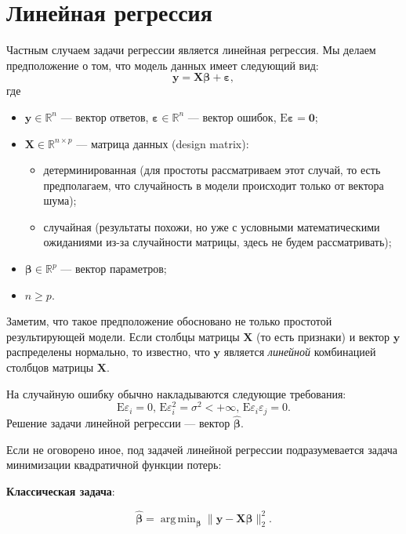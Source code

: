\documentclass[12pt,a4paper,final]{article}
\newcommand{\betah}{\hat{\bm \beta}}
\newcommand{\betaa}{\bm{\beta}}
\newcommand{\epss}{\bm{\varepsilon}}
\newcommand{\E}{\mathrm{E}}
\newcommand{\X}{\bm{X}}
\newcommand{\y}{\bm{y}}
\newcommand{\1}{\mathds{1}}
\DeclareMathOperator*{\argmin}{arg\,min}
\begin{document}
\section{Линейная регрессия}

Частным случаем задачи регрессии является линейная регрессия. Мы делаем предположение о том, что модель данных имеет следующий вид:
\begin{equation}
	\bm y = \X \betaa + \epss,
\end{equation}
где 
\begin{itemize}
	\item $\bm y \in \mathbb R^n$ --- вектор ответов,  $\epss \in \mathbb R^n$ --- вектор ошибок, $\mathrm E\epss = \bm 0$;
	\item $\X \in \mathbb R^{n \times p}$ --- матрица данных (design matrix):
	\begin{itemize}
	\item детерминированная (для простоты рассматриваем этот случай, то есть предполагаем, что случайность в модели происходит только от вектора шума);
	\item случайная (результаты похожи, но уже с условными математическими ожиданиями из-за случайности матрицы, здесь не будем рассматривать);
	\end{itemize}		
	\item $\betaa \in \mathbb R^p$ --- вектор параметров;
	\item $n\geqslant p.$
	\end{itemize}
	
Заметим, что такое предположение обосновано не только простотой результирующей модели. Если столбцы матрицы $\X$ (то есть признаки) и вектор $\y$ распределены нормально, то известно, что $\y$ является \textit{линейной} 	комбинацией столбцов матрицы $\X$.


На случайную ошибку обычно накладываются следующие требования:
\begin{equation}
  \E \varepsilon_i = 0,\, \E \varepsilon_i^2 = \sigma^2 < +\infty,\,  \E \varepsilon_i \varepsilon_j = 0.
\label{req:err}
\end{equation}
Решение задачи линейной регрессии --- вектор $\betah$. 

Если не оговорено иное, под задачей линейной регрессии подразумевается задача минимизации квадратичной функции потерь:

\textbf{Классическая задача}:

$$\betah = \argmin_{\betaa}{\|\bm y - \bm X \betaa\|^2_2}.$$
\end{document}
